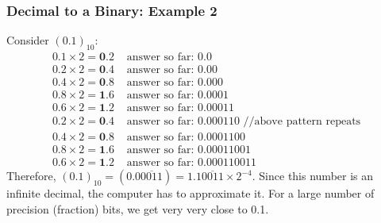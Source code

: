 \begin{frame}\frametitle{Decimal to a Binary: Example 2}

Consider $(0.1)_{10}$:
\begin{align*}
0.1 \times 2 = \mathbf{0}.2 &\text{ answer so far: 0.0}\\
0.2 \times 2 = \mathbf{0}.4 &\text{ answer so far: 0.00}\\
0.4 \times 2 = \mathbf{0}.8 &\text{ answer so far: 0.000}\\
0.8 \times 2 = \mathbf{1}.6 &\text{ answer so far: 0.0001}\\
0.6 \times 2 = \mathbf{1}.2 &\text{ answer so far: 0.00011}\\
0.2 \times 2 = \mathbf{0}.4 &\text{ answer so far: 0.000110 //above pattern repeats}\\
0.4 \times 2 = \mathbf{0}.8 &\text{ answer so far: 0.0001100} \\
0.8 \times 2 = \mathbf{1}.6 &\text{ answer so far: 0.00011001}\\
0.6 \times 2 = \mathbf{1}.2 &\text{ answer so far: 0.000110011}
\end{align*}
Therefore, $(0.1)_{10} = (0.0\overline{0011})=1.1\overline{0011} \times 2^{-4}$. Since this number is an infinite decimal, the computer has to approximate it. For a large number of precision (fraction) bits, we get very very close to 0.1.
\end{frame}




